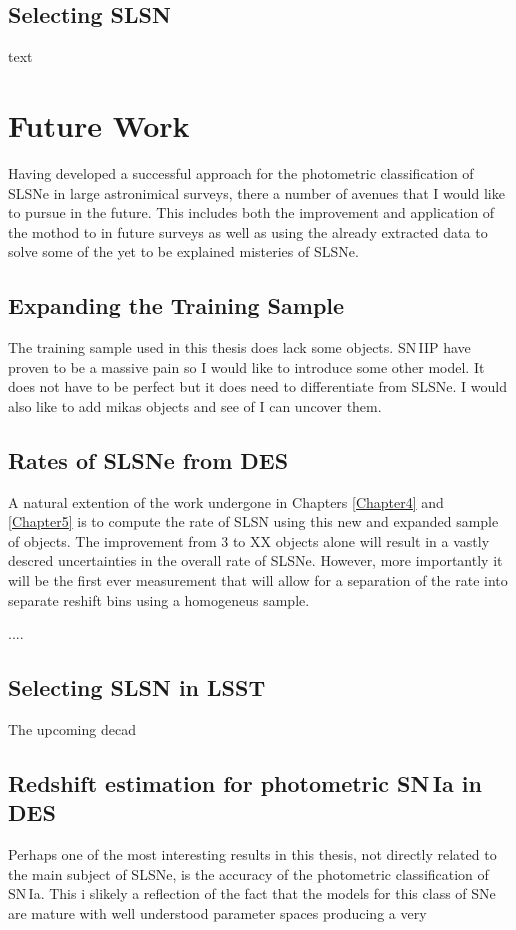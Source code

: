 \subsection{Selecting SLSN}
text

\section{Future Work}
Having developed a successful approach for the photometric classification of SLSNe in large astronimical surveys, there a number of avenues that I would like to pursue in the future. This includes both the improvement and application of the mothod to in future surveys as well as using the already extracted data to solve some of the yet to be explained misteries of SLSNe.

\subsection{Expanding the Training Sample}
The training sample used in this thesis does lack some objects. SN\,IIP have proven to be a massive pain so I would like to introduce some other model. It does not have to be perfect but it does need to differentiate from SLSNe. I would also like to add mikas objects and see of I can uncover them.

\subsection{Rates of SLSNe from DES}
A natural extention of the work undergone in Chapters \ref{Chapter4} and \ref{Chapter5} is to compute the rate of SLSN using this new and expanded sample of objects. The improvement from 3 to XX objects alone will result in a vastly descred uncertainties in the overall rate of SLSNe. However, more importantly it will be the first ever measurement that will allow for a separation of the rate into separate reshift bins using a homogeneus sample.

....

\subsection{Selecting SLSN in LSST}
The upcoming decad

\subsection{Redshift estimation for photometric SN\,Ia in DES}
Perhaps one of the most interesting results in this thesis, not directly related to the main subject of SLSNe, is the accuracy of the photometric classification of SN\,Ia. This i slikely a reflection of the fact that the models for this class of SNe are mature with well understood parameter spaces producing a very
